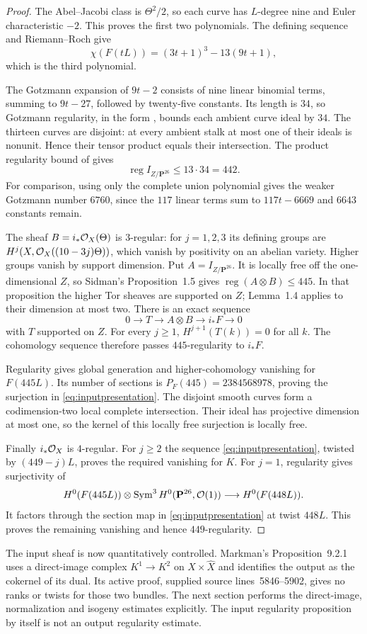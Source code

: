 \begin{proof}
The Abel--Jacobi class is $\Theta^2/2$, so each curve has $L$-degree nine and Euler characteristic $-2$. This proves the first two polynomials. The defining sequence and Riemann--Roch give
\[
 \chi(F(tL))=(3t+1)^3-13(9t+1),
\]
which is the third polynomial.

The Gotzmann expansion of $9t-2$ consists of nine linear binomial terms, summing to $9t-27$, followed by twenty-five constants. Its length is $34$, so Gotzmann regularity, in the form \citet[Theorem~2.7]{Dellaca14}, bounds each ambient curve ideal by $34$. The thirteen curves are disjoint: at every ambient stalk at most one of their ideals is nonunit. Hence their tensor product equals their intersection. The product regularity bound of \citet[Proposition~1.5 and Corollary~1.6]{Sidman01} gives
\[
 \operatorname{reg}I_{Z/\mathbf P^{26}}\le13\cdot34=442.
\]
For comparison, using only the complete union polynomial gives the weaker Gotzmann number $6760$, since the $117$ linear terms sum to $117t-6669$ and $6643$ constants remain.

The sheaf $B=i_*\mathcal O_X(\Theta)$ is $3$-regular: for $j=1,2,3$ its defining groups are $H^j(X,\mathcal O_X((10-3j)\Theta))$, which vanish by positivity on an abelian variety. Higher groups vanish by support dimension. Put $A=I_{Z/\mathbf P^{26}}$. It is locally free off the one-dimensional $Z$, so Sidman's Proposition~1.5 gives $\operatorname{reg}(A\otimes B)\le445$. In that proposition the higher Tor sheaves are supported on $Z$; Lemma~1.4 applies to their dimension at most two. There is an exact sequence
\[
 0\longrightarrow T\longrightarrow A\otimes B\longrightarrow i_*F\longrightarrow0
\]
with $T$ supported on $Z$. For every $j\ge1$, $H^{j+1}(T(k))=0$ for all $k$. The cohomology sequence therefore passes $445$-regularity to $i_*F$.

Regularity gives global generation and higher-cohomology vanishing for $F(445L)$. Its number of sections is $P_F(445)=2384568978$, proving the surjection in \eqref{eq:inputpresentation}. The disjoint smooth curves form a codimension-two local complete intersection. Their ideal has projective dimension at most one, so the kernel of this locally free surjection is locally free.

Finally $i_*\mathcal O_X$ is $4$-regular. For $j\ge2$ the sequence \eqref{eq:inputpresentation}, twisted by $(449-j)L$, proves the required vanishing for $K$. For $j=1$, regularity gives surjectivity of
\[
 H^0(F(445L))\otimes\operatorname{Sym}^3H^0(\mathbf P^{26},\mathcal O(1))
 \longrightarrow H^0(F(448L)).
\]
It factors through the section map in \eqref{eq:inputpresentation} at twist $448L$. This proves the remaining vanishing and hence $449$-regularity.
\end{proof}

The input sheaf is now quantitatively controlled. Markman's Proposition~9.2.1 uses a direct-image complex $K^1\to K^2$ on $X\times\widehat X$ and identifies the output as the cokernel of its dual. Its active proof, supplied source lines~5846--5902, gives no ranks or twists for those two bundles. The next section performs the direct-image, normalization and isogeny estimates explicitly. The input regularity proposition by itself is not an output regularity estimate.

